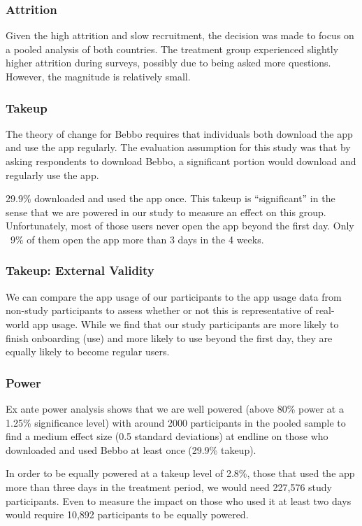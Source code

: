 \documentclass[aspectratio=169]{beamer}
\begin{document}
\begin{frame}[shrink=10]
 \frametitle{Attrition}



Given the high attrition and slow recruitment, the decision was made to focus on a pooled analysis of both countries. The treatment group experienced slightly higher attrition during surveys, possibly due to being asked more questions. However, the magnitude is relatively small.
\end{frame}

\begin{frame}[shrink=25]
  \frametitle{Takeup}



The theory of change for Bebbo requires that individuals both download the app and use the app regularly. The evaluation assumption for this study was that by asking respondents to download Bebbo, a significant portion would download and regularly use the app. 

29.9\% downloaded and used the app once. This takeup is ``significant'' in the sense that we are powered in our study to measure an effect on this group. Unfortunately, most of those users never open the app beyond the first day. Only ~9\% of them open the app more than 3 days in the 4 weeks. 

\end{frame}


\begin{frame}[shrink=25]
  \frametitle{Takeup: External Validity}



We can compare the app usage of our participants to the app usage data from non-study participants to assess whether or not this is representative of real-world app usage. While we find that our study participants are more likely to finish onboarding (use) and more likely to use beyond the first day, they are equally likely to become regular users.

\end{frame}



\begin{frame}
  \frametitle{Power}

Ex ante power analysis shows that we are well powered (above 80\% power at a 1.25\% significance level) with around 2000 participants in the pooled sample to find a medium effect size (0.5 standard deviations) at endline on those who downloaded and used Bebbo at least once (29.9\% takeup).

In order to be equally powered at a takeup level of 2.8\%, those that used the app more than three days in the treatment period, we would need 227,576 study participants. Even to measure the impact on those who used it at least two days would require 10,892 participants to be equally powered. 

\end{frame}
\end{document}
